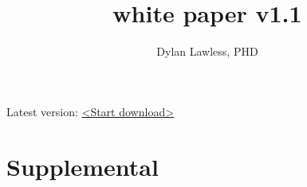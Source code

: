 \documentclass{article}
\newcommand{\whitepaperversion}{white paper v1.1}
\begin{document}
%


\title{\Large \bf \pmu\\
{\whitepaperversion}}
\author[1]{\rm Dylan Lawless, PHD}

\maketitle
\color{kispiblack}
Latest version: \href{https://downgit.github.io/#/home?url=https://github.com/DylanLawless/precision_med_group/blob/main/whitepaper_1/whitepaper_1.1.pdf}{<Start download>}
\tableofcontents
{} 
\clearpage


 \clearpage
 \clearpage














\clearpage

\clearpage






\beginsupplement
\section{Supplemental}
\label{sec:Supplemental_text}

\end{document}
